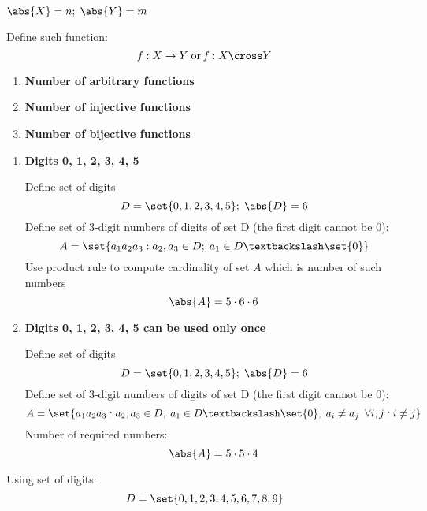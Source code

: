 \exercise*[1.15]

\( \abs{X} = n; \; \abs{Y} = m \)

Define such function:
\[ \mathit{f}: X \to Y \; \text{or} \; \mathit{f}: X \cross Y \]

\begin{enumerate}
    \item \textbf{Number of arbitrary functions}


    \item \textbf{Number of injective functions}


    \item \textbf{Number of bijective functions}


\end{enumerate}



\exercise*[1.16]

\begin{enumerate}
    \item \textbf{Digits 0, 1, 2, 3, 4, 5}

        Define set of digits
        \[ D = \set{0, 1, 2, 3, 4, 5}; \; \abs{D} = 6 \]
        Define set of 3-digit numbers of digits of set D (the first digit cannot be 0):
        \[ A = \set{ a_1 a_2 a_3 : a_2, a_3 \in D; \; a_1 \in D \textbackslash \set{0}  } \]
        Use product rule to compute cardinality of set \(A\) which is number of such numbers
        \[ \abs{A} = 5 \cdot 6 \cdot 6 \]

    \item \textbf{Digits 0, 1, 2, 3, 4, 5 can be used only once}

        Define set of digits
        \[ D = \set{0, 1, 2, 3, 4, 5}; \; \abs{D} = 6 \]
        Define set of 3-digit numbers of digits of set D (the first digit cannot be 0):
        \[ A = \set{ a_1 a_2 a_3 : a_2, a_3 \in D, \; a_1 \in D \textbackslash \set{0}, \; a_i \neq
        a_j \;\; \forall i, j: i \neq j } \]
        Number of required numbers:
        \[ \abs{A} = 5 \cdot 5 \cdot 4 \]

\end{enumerate}


\exercise*[1.17]

Using set of digits:
\[ D = \set{ 0, 1, 2, 3, 4, 5, 6, 7, 8, 9 } \]

